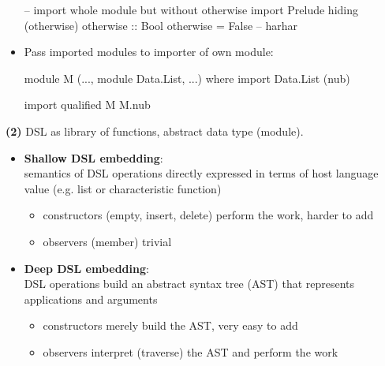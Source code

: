 \begin{itemize}
\begin{codebox}[haskell]
-- import whole module but without otherwise
import Prelude hiding (otherwise)
otherwise :: Bool
otherwise = False -- harhar
    \end{codebox}
    \item Pass imported modules to importer of own module:
    \begin{codebox}[haskell]
module M (..., module Data.List, ...) where
    import Data.List (nub)
    \end{codebox}
    \begin{codebox}[haskell]
import qualified M
    M.nub
    \end{codebox}
\end{itemize}



\vspace{2cm}

\textbf{(2)}
DSL as library of functions, abstract data type (module).
\begin{itemize}
    \item \textbf{Shallow DSL embedding}:\\
    semantics of DSL operations directly expressed in terms of host language value (e.g. list or characteristic function)
    \begin{itemize}
        \item constructors (empty, insert, delete) perform the work, harder to add
        \item observers (member) trivial
    \end{itemize}
    \item \textbf{Deep DSL embedding}:\\
    DSL operations build an abstract syntax tree (AST) that represents applications and arguments
    \begin{itemize}
        \item constructors merely build the AST, very easy to add
        \item observers interpret (traverse) the AST and perform the work
    \end{itemize}

\end{itemize}





